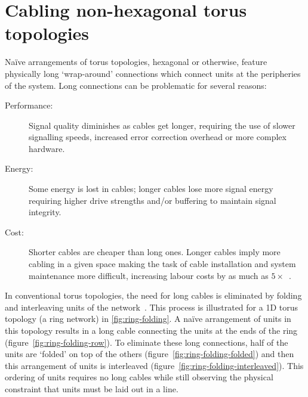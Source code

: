 	\section{Cabling non-hexagonal torus topologies}
		
		Na\"ive arrangements of torus topologies, hexagonal or otherwise, feature
		physically long `wrap-around' connections which connect units at the
		peripheries of the system. Long connections can be problematic for several
		reasons:
		
		\begin{description}
			
			\item[Performance:] Signal quality diminishes as cables get longer,
			requiring the use of slower signalling speeds, increased error
			correction overhead or more complex hardware.
			
			\item[Energy:] Some energy is lost in cables; longer cables lose more
			signal energy requiring higher drive strengths and/or buffering to
			maintain signal integrity.
			
			\item[Cost:] Shorter cables are cheaper than long ones.  Longer cables
			imply more cabling in a given space making the task of cable installation
			and system maintenance more difficult, increasing labour costs by as much
			as $5\times$~\cite{curtis12}.
			
		\end{description}
		
		In conventional torus topologies, the need for long cables is eliminated by
		folding and interleaving units of the network~\cite[chapter~5]{dally04}.
		This process is illustrated for a 1D torus topology (a ring network) in
		\ref{fig:ring-folding}. A na\"ive arrangement of units in this topology
		results in a long cable connecting the units at the ends of the ring
		(figure~\ref{fig:ring-folding-row}).  To eliminate these long connections,
		half of the units are `folded' on top of the others
		(figure~\ref{fig:ring-folding-folded}) and then this arrangement of units
		is interleaved (figure~\ref{fig:ring-folding-interleaved}). This ordering
		of units requires no long cables while still observing the physical
		constraint that units must be laid out in a line.
		
